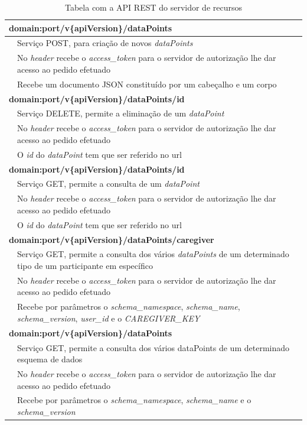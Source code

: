 \begin{table}[H]
\label{t:apirest-data}
\centering
\begin{tabularx}{1\textwidth}{|p{0.3cm} p{14.4cm}|}
\multicolumn{2}{l}{\textbf{domain:port/v\{apiVersion\}/dataPoints}}  \\ \hline 
 & Serviço POST, para criação de novos  \textit{dataPoints} \\
 & No  \textit{header} recebe o  \textit{access\_token} para o servidor de autorização lhe dar acesso ao pedido efetuado \\
 & Recebe um documento JSON constituído por um cabeçalho e um corpo \\ \hline
\multicolumn{2}{l}{\textbf{domain:port/v\{apiVersion\}/dataPoints/id}} \\ \hline
 & Serviço DELETE, permite a eliminação de um  \textit{dataPoint} \\
 & No  \textit{header} recebe o  \textit{access\_token} para o servidor de autorização lhe dar acesso ao pedido efetuado \\
 & O  \textit{id} do  \textit{dataPoint} tem que ser referido no url \\ \hline
 \multicolumn{2}{l}{\textbf{domain:port/v\{apiVersion\}/dataPoints/id}} \\ \hline
 & Serviço GET, permite a consulta de um  \textit{dataPoint} \\
 & No  \textit{header} recebe o  \textit{access\_token} para o servidor de autorização lhe dar acesso ao pedido efetuado \\
 & O  \textit{id} do  \textit{dataPoint} tem que ser referido no url \\ \hline
 \multicolumn{2}{l}{\textbf{domain:port/v\{apiVersion\}/dataPoints/caregiver}} \\ \hline
 & Serviço GET, permite a consulta dos vários  \textit{dataPoints} de um determinado tipo de um participante em específico \\
 & No  \textit{header} recebe o  \textit{access\_token} para o servidor de autorização lhe dar acesso ao pedido efetuado \\
 & Recebe por parâmetros o  \textit{schema\_namespace},  \textit{schema\_name},  \textit{schema\_version},  \textit{user\_id} e o  \textit{CAREGIVER\_KEY} \\ \hline
 \multicolumn{2}{l}{\textbf{domain:port/v\{apiVersion\}/dataPoints}} \\ \hline
 & Serviço GET, permite a consulta dos vários dataPoints de um determinado esquema de dados \\
 & No  \textit{header} recebe o  \textit{access\_token} para o servidor de autorização lhe dar acesso ao pedido efetuado \\
 & Recebe por parâmetros o  \textit{schema\_namespace},  \textit{schema\_name} e o  \textit{schema\_version} \\ \hline
\end{tabularx}
\caption{Tabela com a API REST do servidor de recursos}
\end{table}


